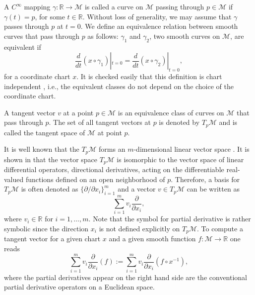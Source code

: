 A $C^{\infty}$ mapping $\gamma:\mathbb R \to \mathcal M$ is called a curve on $\mathcal M$ passing through $p\in \mathcal M$ if $\gamma(t) = p$, for some $t\in \mathbb R$. Without loss of generality, we may assume that $\gamma$ passes through $p$ at $t=0$. We define an equivalence relation between smooth curves that pass through $p$ as follows: $\gamma_1$ and $\gamma_2$, two smooth curves on $\mathcal M$, are equivalent if
\begin{equation} \label{eq:2.1}
	\frac{d}{dt}(x\circ \gamma_1)|_{t=0} = \frac{d}{dt}(x\circ \gamma_2)|_{t=0},
\end{equation}
for a coordinate chart $x$. It is checked easily that this definition is chart independent \cite{abraham1978foundations}, i.e., the equivalent classes do not depend on the choice of the coordinate chart.
\begin{definition}
A tangent vector $v$ at a point $p\in \mathcal M$ is an equivalence class of curves on $\mathcal M$ that pass through $p$. The set of all tangent vectors at $p$ is denoted by $T_p\mathcal M$ and is called the tangent space of $\mathcal M$ at point $p$.
\end{definition}
It is well known that the $T_p\mathcal M$ forms an $m$-dimensional linear vector space \cite{abraham1978foundations,robbin2011introduction}. It is shown in \cite{abraham1978foundations,robbin2011introduction} that the vector space $T_p\mathcal M$ is isomorphic to the vector space of linear differential operators, directional derivatives, acting on the differentiable real-valued functions defined on an open neighborhood of $p$. Therefore, a basis for $T_p\mathcal M$ is often denoted as $\{ \partial /\partial x_i \}_{i=1}^{m}$ and a vector $v\in T_p\mathcal M$ can be written as 
\begin{equation} \label{eq:2.11}
	\sum_{i=1}^m v_i \frac{\partial}{\partial x_i},
\end{equation}
where $v_i\in \mathbb R$ for $i = 1,\dots,m$. Note that the symbol for partial derivative is rather symbolic since the direction $x_i$ is not defined explicitly on $T_p\mathcal M$. To compute a tangent vector for a given chart $x$ and a given smooth function $f:\mathcal M \to \mathbb R$ one reads
\begin{equation} \label{eq:2.12}
	\sum_{i=1}^m v_i \frac{\partial}{\partial x_i} (f) := \sum_{i=1}^m v_i \frac{\partial}{\partial x_i} (f \circ x^{-1}),
\end{equation}
where the partial derivatives appear on the right hand side are the conventional partial derivative operators on a Euclidean space.

